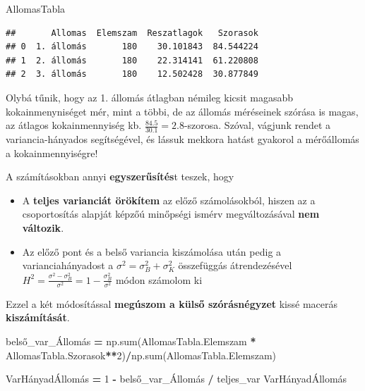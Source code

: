 \documentclass[
]{book}
\newenvironment{Shaded}{\begin{snugshade}}{\end{snugshade}}
\newcommand{\BuiltInTok}[1]{#1}
\newcommand{\DecValTok}[1]{\textcolor[rgb]{0.00,0.00,0.81}{#1}}
\newcommand{\NormalTok}[1]{#1}
\newcommand{\OperatorTok}[1]{\textcolor[rgb]{0.81,0.36,0.00}{\textbf{#1}}}
\providecommand{\tightlist}{%
  \setlength{\itemsep}{0pt}\setlength{\parskip}{0pt}}
\begin{document}
\begin{Shaded}
\begin{Highlighting}[]
\NormalTok{AllomasTabla}
\end{Highlighting}
\end{Shaded}

\begin{verbatim}
##       Allomas  Elemszam  Reszatlagok   Szorasok
## 0  1. állomás       180    30.101843  84.544224
## 1  2. állomás       180    22.314141  61.220808
## 2  3. állomás       180    12.502428  30.877849
\end{verbatim}

Olybá tűnik, hogy az 1. állomás átlagban némileg kicsit magasabb kokainmenyniséget mér, mint a többi, de az állomás méréseinek szórása is magas, az átlagos kokainmennyiség kb. \(\frac{84.5}{30.1}=2.8\)-szorosa.
Szóval, vágjunk rendet a variancia-hányados segítségével, és lássuk mekkora hatást gyakorol a mérőállomás a kokainmennyiségre!

A számításokban annyi \textbf{egyszerűsítés}t teszek, hogy

\begin{itemize}
\tightlist
\item
  A \textbf{teljes varianciát örökítem} az előző számolásokból, hiszen az a csoportosítás alapját képzőú minőpségi ismérv megváltozásával \textbf{nem változik}.
\item
  Az előző pont és a belső variancia kiszámolása után pedig a varianciahányadost a \(\sigma^2=\sigma_B^2+\sigma_K^2\) összefüggás átrendezésével \(H^2=\frac{\sigma^2-\sigma_B^2}{\sigma^2}=1-\frac{\sigma_B^2}{\sigma^2}\) módon számolom ki
\end{itemize}

Ezzel a két módosítással \textbf{megúszom a külső szórásnégyzet} kissé macerás \textbf{kiszámítását}.

\begin{Shaded}
\begin{Highlighting}[]
\NormalTok{belső\_var\_Állomás }\OperatorTok{=}\NormalTok{ np.}\BuiltInTok{sum}\NormalTok{(AllomasTabla.Elemszam }\OperatorTok{*}\NormalTok{ AllomasTabla.Szorasok}\OperatorTok{**}\DecValTok{2}\NormalTok{)}\OperatorTok{/}\NormalTok{np.}\BuiltInTok{sum}\NormalTok{(AllomasTabla.Elemszam)}

\NormalTok{VarHányadÁllomás }\OperatorTok{=} \DecValTok{1} \OperatorTok{{-}}\NormalTok{ belső\_var\_Állomás }\OperatorTok{/}\NormalTok{ teljes\_var}
\NormalTok{VarHányadÁllomás}
\end{Highlighting}
\end{Shaded}
\end{document}
